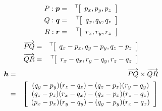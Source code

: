 \documentclass[11pt,a4j]{jarticle}
\begin{document}
  \begin{eqnarray}
    P: {\bm{p}}
      & = &
        {}^{\top}\!{\left[ \begin{array}[c]{c} p_x, p_y, p_z \end{array} \right]}
  \\
    Q: {\bm{q}}
      & = &
        {}^{\top}\!{\left[ \begin{array}[c]{c} q_x, q_y, q_z \end{array} \right]}
  \\
    R: {\bm{r}}
      & = &
        {}^{\top}\!{\left[ \begin{array}[c]{c} r_x, r_y, r_z \end{array} \right]}
  \end{eqnarray}
  \begin{eqnarray}
    {\overrightarrow{PQ}}
      & = &
        {}^{\top}\!{\left[ \begin{array}[c]{c} q_x - p_x, q_y - p_y, q_z - p_z \end{array} \right]}
  \\
    {\overrightarrow{QR}}
      & = &
        {}^{\top}\!{\left[ \begin{array}[c]{c} r_x - q_x, r_y - q_y, r_z - q_z \end{array} \right]}
  \end{eqnarray}
  \begin{eqnarray}
    {\bm{h}}
      & = &
        {\overrightarrow{PQ}} \times {\overrightarrow{QR}}
  \\
      & = &
        \left[ \begin{array}[c]{c} (q_y - p_y)(r_z - q_z) - (q_z - p_z)(r_y - q_y) \\
             (q_z - p_z)(r_x - q_x) - (q_x - p_x)(r_z - q_z) \\
             (p_x - p_x)(r_y - q_y) - (q_y - p_y)(r_x - q_x) \end{array} \right]
  \end{eqnarray}
\end{document}
